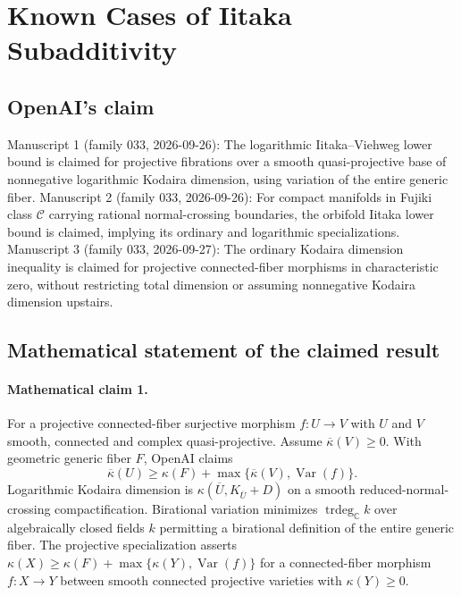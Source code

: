 \documentclass[11pt]{article}
\begin{document}
\section*{Known Cases of Iitaka Subadditivity}

\subsection{OpenAI's claim}
Manuscript 1 (family 033, 2026-09-26): The logarithmic Iitaka--Viehweg lower bound is claimed for projective fibrations over a smooth quasi-projective base of nonnegative logarithmic Kodaira dimension, using variation of the entire generic fiber. Manuscript 2 (family 033, 2026-09-26): For compact manifolds in Fujiki class $\mathcal C$ carrying rational normal-crossing boundaries, the orbifold Iitaka lower bound is claimed, implying its ordinary and logarithmic specializations. Manuscript 3 (family 033, 2026-09-27): The ordinary Kodaira dimension inequality is claimed for projective connected-fiber morphisms in characteristic zero, without restricting total dimension or assuming nonnegative Kodaira dimension upstairs.

\subsection{Mathematical statement of the claimed result}
\paragraph{Mathematical claim 1.} For a projective connected-fiber surjective morphism $f:U\to V$ with $U$ and $V$ smooth, connected and complex quasi-projective. Assume $\overline\kappa(V)\ge0$. With geometric generic fiber $F$, OpenAI claims
\[
\overline\kappa(U)\ge\kappa(F)+\max\{\overline\kappa(V),\operatorname{Var}(f)\}.
\]
Logarithmic Kodaira dimension is $\kappa(\overline U,K_{\overline U}+D)$ on a smooth reduced-normal-crossing compactification. Birational variation minimizes $\operatorname{trdeg}_{\mathbb C}k$ over algebraically closed fields $k$ permitting a birational definition of the entire generic fiber. The projective specialization asserts $\kappa(X)\ge\kappa(F)+\max\{\kappa(Y),\operatorname{Var}(f)\}$ for a connected-fiber morphism $f:X\to Y$ between smooth connected projective varieties with $\kappa(Y)\ge0$.
\end{document}
